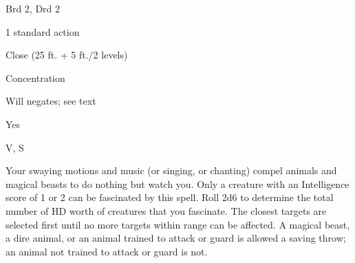 
\begin{description*}
\item[Level:] Brd 2, Drd 2
\item[Casting Time:] 1 standard action
\item[Range:] Close (25 ft. + 5 ft./2 levels)
\item[Duration:] Concentration
\item[Saving Throw:] Will negates; see text
\item[Spell Resistance:] Yes
\item[Components:] V, S
\end{description*}

Your swaying motions and music (or singing, or chanting) compel animals and magical
beasts to do nothing but watch you. Only a creature with an Intelligence score
of 1 or 2 can be fascinated by this spell. Roll 2d6 to determine the total number
of HD worth of creatures that you fascinate. The closest targets are selected first
until no more targets within range can be affected.
A magical beast, a dire animal, or an animal trained to attack or guard is allowed
a saving throw; an animal not trained to attack or guard is not.